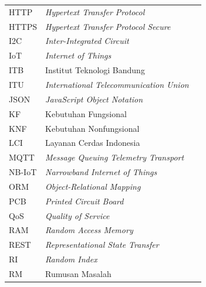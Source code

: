 \begin{longtable}{@{} l >{\raggedright\arraybackslash}p{8cm} c @{}}
HTTP   & \textit{Hypertext Transfer Protocol}                     & \pageref{sec:studi-protokol} \\
HTTPS  & \textit{Hypertext Transfer Protocol Secure}              & \pageref{sec:studi-protokol} \\
I2C    & \textit{Inter-Integrated Circuit}                        & \pageref{tab:pemilihan-teknologi} \\
IoT    & \textit{Internet of Things}                              & \pageref{chap:pendahuluan} \\
ITB    & Institut Teknologi Bandung                               & \pageref{chap:pendahuluan} \\
ITU    & \textit{International Telecommunication Union}           & \pageref{chap:studi-literatur} \\
JSON   & \textit{JavaScript Object Notation}                      & \pageref{tab:payload-data} \\
KF     & Kebutuhan Fungsional                                     & \pageref{tab:kebutuhan-fungsional} \\
KNF    & Kebutuhan Nonfungsional                                  & \pageref{tab:kebutuhan-nonfungsional} \\
LCI    & Layanan Cerdas Indonesia                                 & \pageref{chap:pendahuluan} \\
MQTT   & \textit{Message Queuing Telemetry Transport}             & \pageref{chap:studi-literatur} \\
NB-IoT & \textit{Narrowband Internet of Things}                   & \pageref{chap:studi-literatur} \\
ORM    & \textit{Object-Relational Mapping}                       & \pageref{tab:teknologi-dashboard} \\
PCB    & \textit{Printed Circuit Board}                           & \pageref{sec:diskusi-evaluasi} \\
QoS    & \textit{Quality of Service}                              & \pageref{sec:perancangan-middleware} \\
RAM    & \textit{Random Access Memory}                            & \pageref{tab:perbandingan-mcu} \\
REST   & \textit{Representational State Transfer}                 & \pageref{sec:perancangan-database} \\
RI     & \textit{Random Index}                                    & \pageref{tab:bobot-kriteria} \\
RM     & Rumusan Masalah                                          & \pageref{sec:analisis-kebutuhan} \\

\end{longtable}
